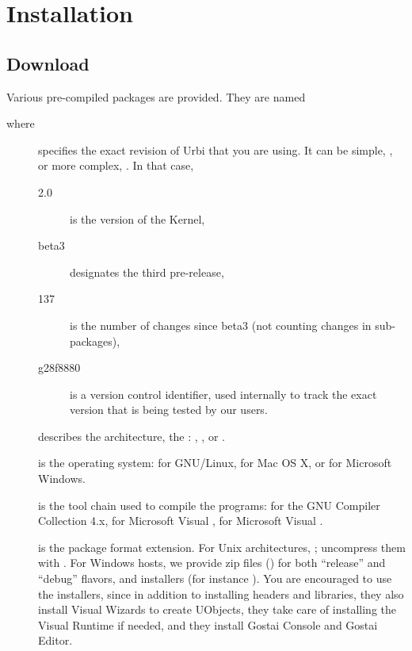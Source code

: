 
\chapter{Installation}
\label{sec:installation}

\section{Download}

Various pre-compiled packages are provided.  They are named
\begin{center}
\end{center}
where
\begin{description}
\item[] specifies the exact revision of Urbi that you are
  using.  It can be simple, , or more complex,
  .  In that case,
  \begin{description}
  \item[2.0] is the version of the \urbi Kernel,
  \item[beta3] designates the third pre-release,
  \item[137] is the number of changes since beta3 (not counting
    changes in sub-packages),
  \item[g28f8880] is a version control identifier, used internally to
    track the exact version that is being tested by our users.
  \end{description}
\item[] describes the architecture, the :
  , , or .
\item[] is the operating system:  for GNU/Linux,
   for Mac OS X, or  for Microsoft Windows.
\item[] is the tool chain used to compile the programs:
   for the GNU Compiler Collection 4.x,  for
  Microsoft Visual ,  for Microsoft Visual
  .
\item[] is the package format extension.  For Unix architectures,
  ; uncompress them with .  For
  Windows hosts, we provide zip files () for both ``release''
  and ``debug'' flavors, and installers (for instance ).  You
  are encouraged to use the installers, since in addition to installing
  headers and libraries, they also install Visual \Cxx Wizards to create
  UObjects, they take care of installing the Visual Runtime if needed, and
  they install Gostai Console and Gostai Editor.
\end{description}

